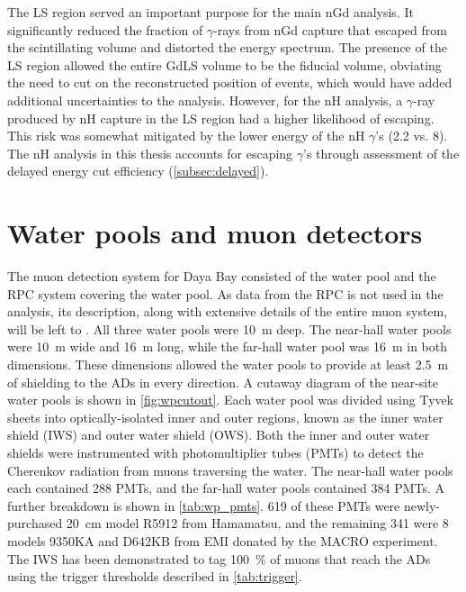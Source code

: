 The LS region served an important purpose for the main nGd \thetaot{} analysis.
It significantly reduced the fraction of $\gamma$-rays from nGd capture
that escaped from the scintillating volume and distorted the energy spectrum.
The presence of the LS region allowed the entire GdLS volume to be
the fiducial volume, obviating the need to cut on the reconstructed position
of events, which would have added additional uncertainties to the analysis.
However, for the nH analysis,
a $\gamma$-ray produced by nH capture in the LS region
had a higher likelihood of escaping.
This risk was somewhat mitigated by the lower energy of the nH $\gamma$'s
(\SI{2.2}{\mev} vs. \SI{8}{\mev}).
The nH \thetaot{} analysis in this thesis accounts for escaping $\gamma$'s
through assessment of the delayed energy cut efficiency (\cref{subsec:delayed}).


\section{Water pools and muon detectors}
\label{sec:wp}

The muon detection system for Daya Bay consisted of
the water pool and the RPC system covering the water pool.
As data from the RPC is not used in the \thetaot{} analysis,
its description, along with extensive details of the entire muon system,
will be left to \cite{muonsystem2015}.
All three water pools were \SI{10}{\m} deep.
The near-hall water pools were \SI{10}{\m} wide and \SI{16}{\m} long,
while the far-hall water pool was \SI{16}{\m} in both dimensions.
These dimensions allowed the water pools to provide at least \SI{2.5}{\m} of shielding
to the ADs in every direction.
A cutaway diagram of the near-site water pools is shown in \cref{fig:wpcutout}.
Each water pool was divided using Tyvek sheets
into optically-isolated inner and outer regions,
known as the inner water shield (IWS) and outer water shield (OWS).
Both the inner and outer water shields were instrumented with photomultiplier tubes (PMTs)
to detect the Cherenkov radiation from muons traversing the water.
The near-hall water pools each contained \num{288} PMTs,
and the far-hall water pools contained \num{384} PMTs.
A further breakdown is shown in \cref{tab:wp_pmts}.
\num{619} of these PMTs were newly-purchased \SI{20}{\cm}
model R5912 from Hamamatsu,
and the remaining \num{341} were \SI{8}{\inch} models 9350KA
and D642KB from EMI
donated by the MACRO experiment.
The IWS has been demonstrated to tag \SI{100}{\percent} of muons
that reach the ADs using the trigger thresholds described in \cref{tab:trigger}.



